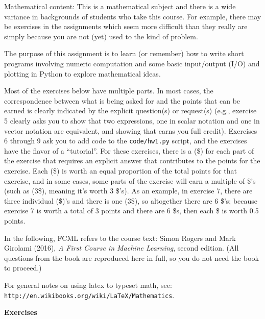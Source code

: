 \documentclass[10pt]{article}
\begin{document}
Mathematical content: This is a mathematical subject and there is a wide variance in backgrounds of students who take this course. For example, there may be exercises in the assignments which seem more difficult than they really are simply because you are not (yet) used to the kind of problem. 

The purpose of this assignment is to learn (or remember) how to write short programs involving numeric computation and some basic input/output (I/O) and plotting in Python to explore mathematical ideas. 

Most of the exercises below have multiple parts.  In most cases, the correspondence between what is being asked for and the points that can be earned is clearly indicated by the explicit question(s) or request(s) (e.g., exercise 5 clearly asks you to show that two expressions, one in scalar notation and one in vector notation are equivalent, and showing that earns you full credit). Exercises 6 through 9 ask you to add code to the {\tt code/hw1.py} script, and the exercises have the flavor of a ``tutorial''. For these exercises, there is a (\$) for each part of the exercise that requires an explicit answer that contributes to the points for the exercise. Each (\$) is worth an equal proportion of the total points for that exercise, and in some cases, some parts of the exercise will earn a multiple of \$'s (such as (3\$), meaning it's worth 3 \$'s). As an example, in exercise 7, there are three individual (\$)'s and there is one (3\$), so altogether there are 6 \$'s; because exercise 7 is worth a total of 3 points and there are 6 \$s, then each \$ is worth 0.5 points.

In the following, FCML refers to the course text: Simon Rogers and Mark Girolami (2016), {\em A First Course in Machine Learning}, second edition.  (All questions from the book are reproduced here in full, so you do not need the book to proceed.)

For general notes on using latex to typeset math, see: {\tt http://en.wikibooks.org/wiki/LaTeX/Mathematics}.

\vspace{.5cm}

{\Large {\bf Exercises}}

\vspace{.5cm}

\end{document}
